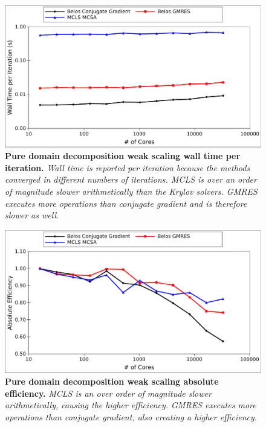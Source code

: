 \begin{figure}[t!]
  \begin{center}
    \includegraphics[width=6in]{chapters/parallel_mc/titan_pure_weak_time.pdf}
  \end{center}
  \caption{\textbf{Pure domain decomposition weak scaling wall time
      per iteration.} \textit{Wall time is reported per iteration
      because the methods converged in different numbers of
      iterations. MCLS is over an order of magnitude slower
      arithmetically than the Krylov solvers. GMRES executes more
      operations than conjugate gradient and is therefore slower as
      well.}}
  \label{fig:titan_pure_weak_time}
\end{figure}

\begin{figure}[t!]
  \begin{center}
    \includegraphics[width=6in]{chapters/parallel_mc/titan_weak_absolute.pdf}
  \end{center}
  \caption{\textbf{Pure domain decomposition weak scaling absolute
      efficiency.} \textit{MCLS is an over order of magnitude slower
      arithmetically, causing the higher efficiency. GMRES executes
      more operations than conjugate gradient, also creating a higher
      efficiency.}}
  \label{fig:titan_weak_absolute}
\end{figure}

